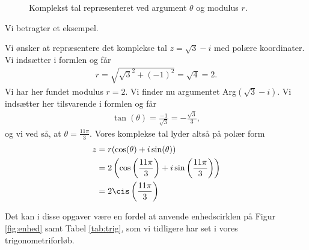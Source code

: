 \begin{figure}[H]
	\centering
	\caption{Komplekst tal repræsenteret ved argument $\theta$ og modulus $r$.}
	\label{fig:polær}
\end{figure}
Vi betragter et eksempel.
\begin{exa}
	Vi ønsker at repræsentere det komplekse tal $z = \sqrt{3} - i$ med polære koordinater. Vi indsætter i formlen og får
	\begin{align*}
		r = \sqrt{\sqrt{3}^2 + (-1)^2} = \sqrt{4} = 2.
	\end{align*}
	Vi har her fundet modulus $r = 2$. Vi finder nu argumentet Arg$(\sqrt{3}- i)$. Vi indsætter her tilsvarende i 
	formlen og får
	\begin{align*}
		\tan(\theta) = \frac{-1}{\sqrt{3}} = -\frac{\sqrt{3}}{3},
	\end{align*}
	og vi ved så, at $\theta = \frac{11\pi}{3}$. Vores komplekse tal lyder altså på polær form
	\begin{align*}
		z &= r(\cos(\theta) + i\sin(\theta)) \\
		&= 2\left(\cos\left(\frac{11\pi}{3}\right) + i\sin\left(\frac{11\pi}{3}\right)\right)\\
		&= 2\cis \left(\frac{11\pi}{3} \right)
	\end{align*}
\end{exa}
Det kan i disse opgaver være en fordel at anvende enhedscirklen på Figur \ref{fig:enhed} samt Tabel \ref{tab:trig}, som vi tidligere har set i vores trigonometriforløb.
